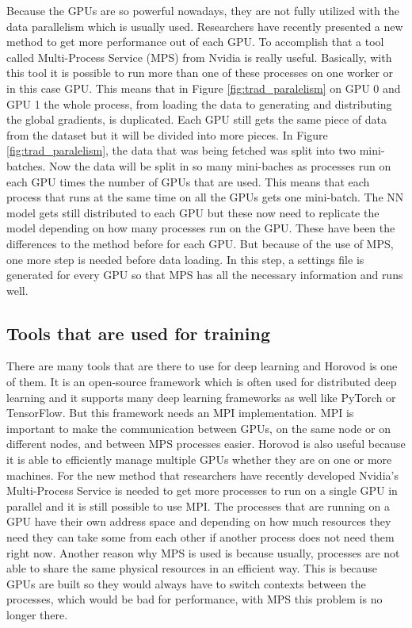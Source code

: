 \documentclass[conference]{IEEEtran}
\begin{document}
Because the GPUs are so powerful nowadays, they are not fully utilized with the data parallelism which is usually used. Researchers have recently presented a new method to get more performance out of each GPU. To accomplish that a tool called Multi-Process Service (MPS) from Nvidia is really useful. Basically, with this tool it is possible to run more than one of these processes on one worker or in this case GPU. This means that in Figure \ref{fig:trad_paralelism} on GPU 0 and GPU 1 the whole process, from loading the data to generating and distributing the global gradients, is duplicated. Each GPU still gets the same piece of data from the dataset but it will be divided into more pieces. In Figure \ref{fig:trad_paralelism}, the data that was being fetched was split into two mini-batches. Now the data will be split in so many mini-baches as processes run on each GPU times the number of GPUs that are used. This means that each process that runs at the same time on all the GPUs gets one mini-batch. The NN model gets still distributed to each GPU but these now need to replicate the model depending on how many processes run on the GPU. These have been the differences to the method before for each GPU. But because of the use of MPS, one more step is needed before data loading. In this step, a settings file is generated for every GPU so that MPS has all the necessary information and runs well.\cite{b11}

\vspace{\baselineskip}
\subsection{Tools that are used for training}

There are many tools that are there to use for deep learning and Horovod is one of them. It is an open-source framework which is often used for distributed deep learning and it supports many deep learning frameworks as well like PyTorch or TensorFlow. But this framework needs an MPI implementation. MPI is important to make the communication between GPUs, on the same node or on different nodes, and between MPS processes easier. Horovod is also useful because it is able to efficiently manage multiple GPUs whether they are on one or more machines. For the new method that researchers have recently developed Nvidia’s Multi-Process Service is needed to get more processes to run on a single GPU in parallel and it is still possible to use MPI. The processes that are running on a GPU have their own address space and depending on how much resources they need they can take some from each other if another process does not need them right now. Another reason why MPS is used is because usually, processes are not able to share the same physical resources in an efficient way. This is because GPUs are built so they would always have to switch contexts between the processes, which would be bad for performance, with MPS this problem is no longer there.\cite{b11}
\end{document}
